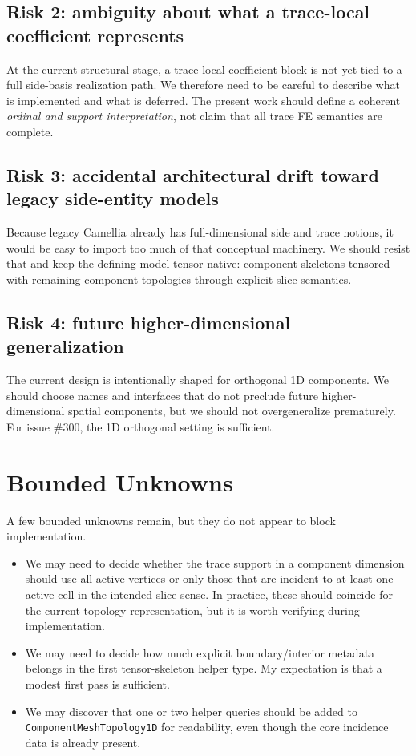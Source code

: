 \documentclass[11pt]{article}
\begin{document}
\subsection{Risk 2: ambiguity about what a trace-local coefficient represents}

At the current structural stage, a trace-local coefficient block is not yet tied to a full side-basis realization path. We therefore need to be careful to describe what is implemented and what is deferred. The present work should define a coherent \emph{ordinal and support interpretation}, not claim that all trace FE semantics are complete.

\subsection{Risk 3: accidental architectural drift toward legacy side-entity models}

Because legacy Camellia already has full-dimensional side and trace notions, it would be easy to import too much of that conceptual machinery. We should resist that and keep the defining model tensor-native: component skeletons tensored with remaining component topologies through explicit slice semantics.

\subsection{Risk 4: future higher-dimensional generalization}

The current design is intentionally shaped for orthogonal 1D components. We should choose names and interfaces that do not preclude future higher-dimensional spatial components, but we should not overgeneralize prematurely. For issue \#300, the 1D orthogonal setting is sufficient.

\section{Bounded Unknowns}

A few bounded unknowns remain, but they do not appear to block implementation.

\begin{itemize}[leftmargin=2em]
  \item We may need to decide whether the trace support in a component dimension should use all active vertices or only those that are incident to at least one active cell in the intended slice sense. In practice, these should coincide for the current topology representation, but it is worth verifying during implementation.
  \item We may need to decide how much explicit boundary/interior metadata belongs in the first tensor-skeleton helper type. My expectation is that a modest first pass is sufficient.
  \item We may discover that one or two helper queries should be added to \texttt{ComponentMeshTopology1D} for readability, even though the core incidence data is already present.
\end{itemize}
\end{document}
